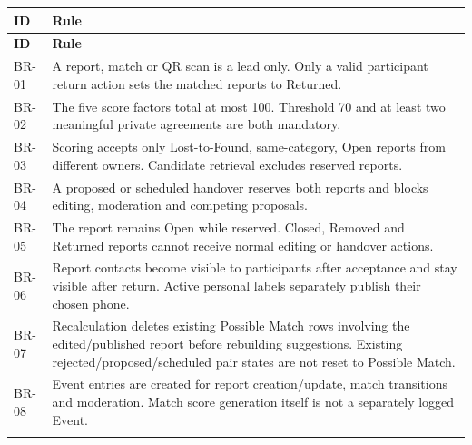 \documentclass[12pt,a4paper,oneside]{report}
\begin{document}
\begin{longtable}{@{}P{0.15\dimexpr\textwidth-12pt\relax}P{0.85\dimexpr\textwidth-12pt\relax}@{}}

\toprule \textbf{ID} & \textbf{Rule} \\ \midrule\endfirsthead

\toprule \textbf{ID} & \textbf{Rule} \\ \midrule\endhead

\bottomrule\endfoot

BR-01 & A report, match or QR scan is a lead only. Only a valid participant return action sets the matched reports to Returned. \\ \addlinespace[3pt]

BR-02 & The five score factors total at most 100. Threshold 70 and at least two meaningful private agreements are both mandatory. \\ \addlinespace[3pt]

BR-03 & Scoring accepts only Lost-to-Found, same-category, Open reports from different owners. Candidate retrieval excludes reserved reports. \\ \addlinespace[3pt]

BR-04 & A proposed or scheduled handover reserves both reports and blocks editing, moderation and competing proposals. \\ \addlinespace[3pt]

BR-05 & The report remains Open while reserved. Closed, Removed and Returned reports cannot receive normal editing or handover actions. \\ \addlinespace[3pt]

BR-06 & Report contacts become visible to participants after acceptance and stay visible after return. Active personal labels separately publish their chosen phone. \\ \addlinespace[3pt]

BR-07 & Recalculation deletes existing Possible Match rows involving the edited/published report before rebuilding suggestions. Existing rejected/proposed/scheduled pair states are not reset to Possible Match. \\ \addlinespace[3pt]

BR-08 & Event entries are created for report creation/update, match transitions and moderation. Match score generation itself is not a separately logged Event. \\ \addlinespace[3pt]

\end{longtable}
\end{document}
